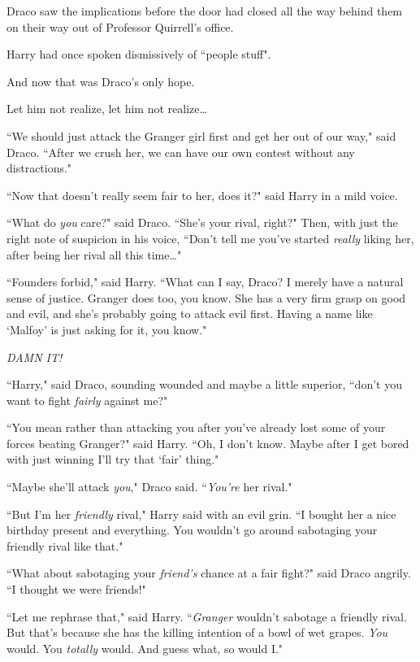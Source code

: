 \later

Draco saw the implications before the door had closed all the way behind them on their way out of Professor Quirrell's office.

Harry had once spoken dismissively of ``people stuff".

And now that was Draco's only hope.

Let him not realize, let him not realize{\ldots}

``We should just attack the Granger girl first and get her out of our way," said Draco. ``After we crush her, we can have our own contest without any distractions."

``Now that doesn't really seem fair to her, does it?" said Harry in a mild voice.

``What do \emph{you} care?" said Draco. ``She's your rival, right?" Then, with just the right note of suspicion in his voice, ``Don't tell me you've started \emph{really} liking her, after being her rival all this time{\ldots}"

``Founders forbid," said Harry. ``What can I say, Draco? I merely have a natural sense of justice. Granger does too, you know. She has a very firm grasp on good and evil, and she's probably going to attack evil first. Having a name like `Malfoy' is just asking for it, you know."

\emph{DAMN IT!}

``Harry," said Draco, sounding wounded and maybe a little superior, ``don't you want to fight \emph{fairly} against me?"

``You mean rather than attacking you after you've already lost some of your forces beating Granger?" said Harry. ``Oh, I don't know. Maybe after I get bored with just winning I'll try that `fair' thing."

``Maybe she'll attack \emph{you}," Draco said. ``\emph{You're} her rival."

``But I'm her \emph{friendly} rival," Harry said with an evil grin. ``I bought her a nice birthday present and everything. You wouldn't go around sabotaging your friendly rival like that."

``What about sabotaging your \emph{friend's} chance at a fair fight?" said Draco angrily. ``I thought we were friends!"

``Let me rephrase that," said Harry. ``\emph{Granger} wouldn't sabotage a friendly rival. But that's because she has the killing intention of a bowl of wet grapes. \emph{You} would. You \emph{totally} would. And guess what, so would I."

